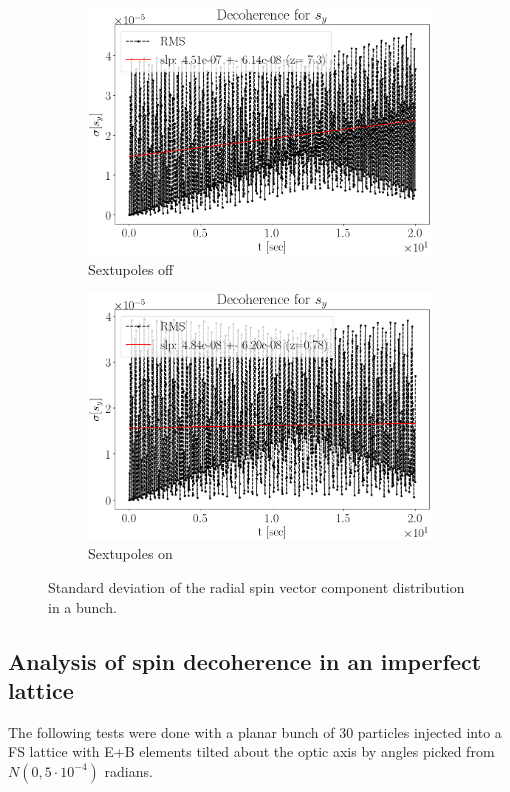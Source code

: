 \begin{figure}[h!]
	\centering
	\begin{subfigure}{\linewidth}
		\includegraphics[height=.35\paperheight]{images/decoh_sim/SY_decoh_20sec_unopt}
		\caption{Sextupoles off}
	\end{subfigure}
	\begin{subfigure}{\linewidth}
		\includegraphics[height=.35\paperheight]{images/decoh_sim/SY_decoh_20sec_opt}
		\caption{Sextupoles on}
	\end{subfigure}
	\caption{Standard deviation of the radial spin vector component distribution in a bunch.\label{fig:decoh:SY_SD}}
\end{figure}

\subsection{Analysis of spin decoherence in an imperfect lattice}\label{sec:decoh:sim-imperfect}
The following tests were done with a planar bunch of 30 particles injected into a FS lattice
with E+B elements tilted about the optic axis by angles picked from $N(0, 5\cdot10^{-4})$ radians.

